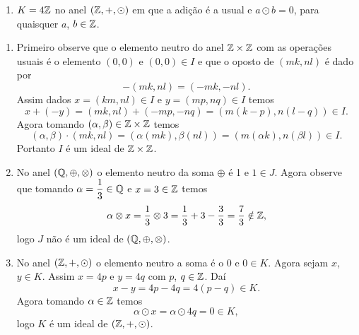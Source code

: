 \begin{exemplo}
\begin{enumerate}[label={\arabic*})]
\begin{enumerate}[label=({\alph*})]
                \item $K = 4\mathbb{Z}$ no anel $(\mathbb{Z}, +, \odot)$ em que a adição é a usual e $a \odot b = 0$, para quaisquer $a$, $b \in \mathbb{Z}$.
            \end{enumerate}
            \begin{solucao}
                \begin{enumerate}[label=({\alph*})]
                    \item Primeiro observe que o elemento neutro do anel $\mathbb{Z} \times \mathbb{Z}$ com as operações usuais é o elemento $(0, 0)$ e $(0, 0) \in I$ e que o oposto de $(mk, nl)$
                        é dado por
                        \[
                            -(mk, nl) = (-mk, -nl).
                        \]
                        Assim dados $x = (km, nl) \in I$ e $y = (mp, nq) \in I$ temos
                        \[
                            x + (-y) = (mk, nl) + (-mp, -nq) = (m(k - p), n(l - q)) \in I.
                        \]
                        Agora tomando $(\alpha, \beta) \in \mathbb{Z} \times \mathbb{Z}$ temos
                        \[
                            (\alpha, \beta) \cdot (mk, nl) = (\alpha(mk), \beta(nl)) = (m(\alpha k), n(\beta l)) \in I.
                        \]
                        Portanto $I$ é um ideal de $\mathbb{Z} \times \mathbb{Z}$.

                    \item No anel $(\mathbb{Q}, \oplus, \otimes)$ o elemento neutro da soma $\oplus$ é 1 e $1 \in J$. Agora observe que tomando $\alpha = \dfrac{1}{3} \in \mathbb{Q}$ e $x =
                        3 \in \mathbb{Z}$ temos
                        \[
                            \alpha \otimes x = \dfrac{1}{3} \otimes 3 = \dfrac{1}{3} + 3 - \dfrac{3}{3} = \dfrac{7}{3} \notin \mathbb{Z},
                        \]
                        logo $J$ não é um ideal de $(\mathbb{Q}, \oplus, \otimes)$.

                    \item No anel $(\mathbb{Z}, +, \odot)$ o elemento neutro a soma é o 0 e $0 \in K$. Agora sejam $x$, $y \in K$. Assim $x = 4p$ e $y = 4q$ com $p$, $q \in \mathbb{Z}$. Daí
                        \[
                            x - y = 4p - 4q = 4(p - q) \in K.
                        \]
                        Agora tomando $\alpha \in \mathbb{Z}$ temos
                        \[
                            \alpha \odot x = \alpha \odot 4q = 0 \in K,
                        \]
                        logo $K$ é um ideal de $(\mathbb{Z}, +, \odot)$.
                \end{enumerate}
            \end{solucao}
    \end{enumerate}
\end{exemplo}

